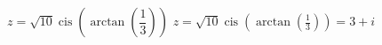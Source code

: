 { $z = \sqrt{10}\operatorname{cis}\left(\arctan\left(\dfrac{1}{3}\right)\right)$ }
{ $z = \sqrt{10}\operatorname{cis}\left(\arctan\left(\frac{1}{3}\right)\right) = 3+i$ }
